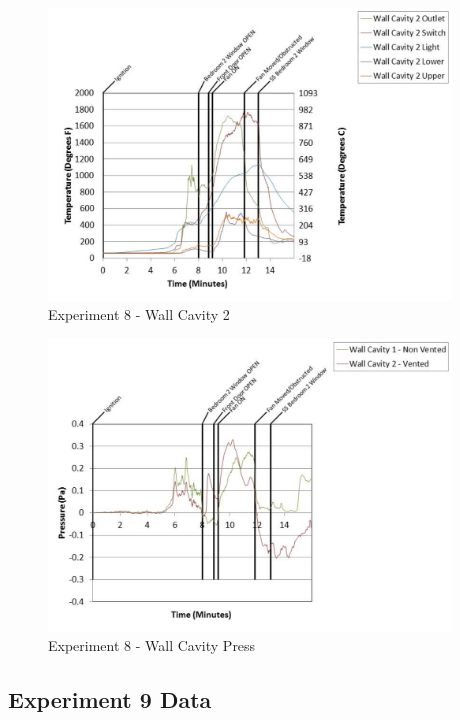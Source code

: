\documentclass{article}
\begin{document}
\begin{appendices}
	\clearpage

	\begin{figure}[h!]
		\centering
		\includegraphics[height=3.05in]{0_Images/Results_Charts/Exp_8_Charts/WallCavity2.pdf}
		\caption{Experiment 8 - Wall Cavity 2}
	\end{figure}
 

	\begin{figure}[h!]
		\centering
		\includegraphics[height=3.05in]{0_Images/Results_Charts/Exp_8_Charts/WallCavityPress.pdf}
		\caption{Experiment 8 - Wall Cavity Press}
	\end{figure}
 
	\clearpage

		\clearpage
\clearpage		\large
\subsection{Experiment 9 Data} \label{App:Exp9Results} 


\end{appendices}
\end{document}
